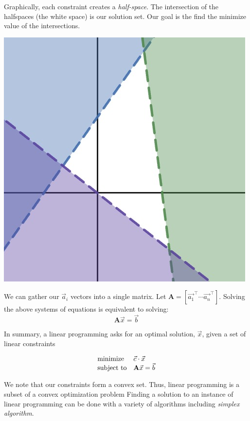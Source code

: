 \documentclass{article}
\begin{document}
Graphically, each constraint creates a \emph{half-space}. 
The intersection of the halfspaces (the white space) is our solution set. 
Our goal is the find the minimize value of the intersections.
\begin{center}
  \includegraphics[scale=.2]{assets/half_space.jpg}  
\end{center}

We can gather our \( \vec{a}_i \) vectors into a single matrix. 
Let $\mathbf{A} = [\vec{a_1}^\top \cdots \vec{a_n}^\top]$.
Solving the above systems of equations is equivalent to solving:
\[
\mathbf{A} \vec{x} = \vec{b}
\]

In summary, a linear programming asks for an optimal solution, \( \vec{x} \), given a set of linear constraints


\begin{align*}
  \begin{array}{ll@{}ll}
    \text{minimize} & \vec{c} \cdot \vec{x}&\\
    \text{subject to}& \mathbf{A} \vec{x} = \vec{b} 
    \end{array}
\end{align*}


We note that our constraints form a convex set. 
Thus, linear programming is a subset of a convex optimization problem
Finding a solution to an instance of linear programming can be done with a variety of algorithms 
including \emph{simplex algorithm}. 
\end{document}
